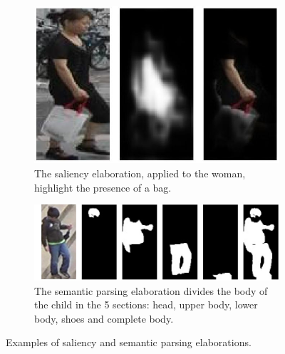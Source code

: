 \begin{figure}[!h]
	\centering
	\begin{subfigure}{0.33\textwidth}
		\includegraphics[width=\linewidth]{images/recognition/ssp_saliency}
		\caption{The saliency elaboration, applied to the woman, highlight the presence of a bag.}
		\label{fig:sub_saliency}
	\end{subfigure}
	\begin{subfigure}{0.66\textwidth}
		\includegraphics[width=\linewidth]{images/recognition/ssp_semanticParsing}
		\captionsetup{margin=0.5cm}
		\caption{The semantic parsing elaboration divides the body of the child in the 5 sections: head, upper body, lower body, shoes and complete body.}
		\label{fig:sub_semanticParsing}
	\end{subfigure}
	\captionsetup{margin=0.5cm}
	\caption{Examples of saliency and semantic parsing elaborations.}
	\label{fig:howItWorks_sspReID}
\end{figure}

